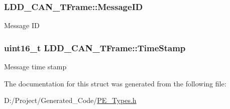 \subsubsection[{Message\+I\+D}]{ L\+D\+D\+\_\+\+C\+A\+N\+\_\+\+T\+Frame\+::\+Message\+I\+D}\label{struct_l_d_d___c_a_n___t_frame_ab6f347f42b51e9ae318e04cdce84c82c}
Message I\+D \hypertarget{struct_l_d_d___c_a_n___t_frame_a9bab04fefdcfc101f718355bc6e20eb4}{}
\subsubsection[{Time\+Stamp}]{\setlength{\rightskip}{0pt plus 5cm}uint16\+\_\+t L\+D\+D\+\_\+\+C\+A\+N\+\_\+\+T\+Frame\+::\+Time\+Stamp}\label{struct_l_d_d___c_a_n___t_frame_a9bab04fefdcfc101f718355bc6e20eb4}
Message time stamp 

The documentation for this struct was generated from the following file\+:\begin{DoxyCompactItemize}
\item 
D\+:/\+Project/\+Generated\+\_\+\+Code/\hyperlink{_p_e___types_8h}{P\+E\+\_\+\+Types.\+h}\end{DoxyCompactItemize}
